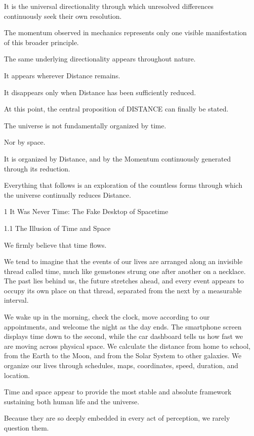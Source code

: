 It is the universal directionality through which unresolved differences continuously seek their own resolution.

The momentum observed in mechanics represents only one visible manifestation of this broader principle.

The same underlying directionality appears throughout nature.

It appears wherever Distance remains.

It disappears only when Distance has been sufficiently reduced.

At this point, the central proposition of DISTANCE can finally be stated.

The universe is not fundamentally organized by time.

Nor by space.

It is organized by Distance, and by the Momentum continuously generated through its reduction.

Everything that follows is an exploration of the countless forms through which the universe continually reduces Distance. 








1 It Was Never Time: The Fake Desktop of Spacetime

1.1 The Illusion of Time and Space

We firmly believe that time flows.

We tend to imagine that the events of our lives are arranged along an invisible thread called time, much like gemstones strung one after another on a necklace. The past lies behind us, the future stretches ahead, and every event appears to occupy its own place on that thread, separated from the next by a measurable interval.

We wake up in the morning, check the clock, move according to our appointments, and welcome the night as the day ends. The smartphone screen displays time down to the second, while the car dashboard tells us how fast we are moving across physical space. We calculate the distance from home to school, from the Earth to the Moon, and from the Solar System to other galaxies. We organize our lives through schedules, maps, coordinates, speed, duration, and location.

Time and space appear to provide the most stable and absolute framework sustaining both human life and the universe.

Because they are so deeply embedded in every act of perception, we rarely question them.

